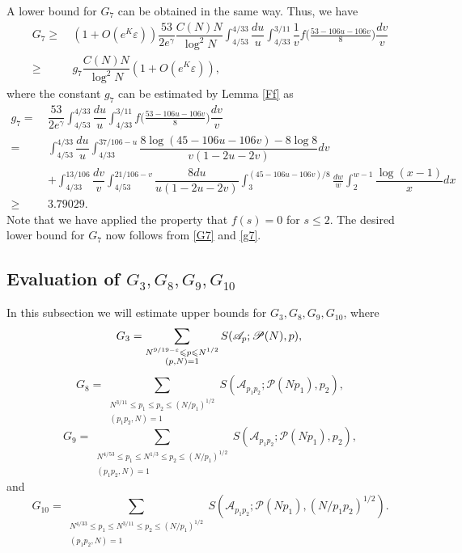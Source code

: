 \documentclass[12pt, a4paper]{amsart}
\def\leq{\leqslant}
\def\le{\leqslant}
\def\ge{\geqslant}
\theoremstyle{plain}
\theoremstyle{remark}
\numberwithin{equation}{section}
\begin{document}
A lower bound for $G_7$ can be obtained in the same way. 
Thus, we have 
\begin{equation}\label{G7}
\begin{aligned}
G_7\ge&\ (1+O(e^K\varepsilon))\dfrac{53}{2e^{\gamma}}\dfrac{C(N)N}{\log ^2N}\int_{4/53}^{4/33}\dfrac{du}{u}\int_{4/33}^{3/11} \dfrac{1}{v}f\bigg(\frac{53-106u-106v}{8}\bigg)\dfrac{dv}{v}\\
\ge &\ g_7\dfrac{C(N)N}{\log^2 N} (1+O(e^K\varepsilon)),
\end{aligned}
\end{equation}
where the constant $g_7$ can be estimated by Lemma \ref{Ff} as 
\begin{equation}\label{g7}
	\begin{aligned}
	g_{7}=\ & \dfrac{53}{2e^{\gamma}}\int_{4/53}^{4/33}\dfrac{du}{u}\int_{4/33}^{3/11}f\bigg(\frac{53-106u-106v}{8}\bigg)\dfrac{dv}{v}\\
	=\ &\int_{4/53}^{4/33}\dfrac{du}{u}\int_{4/33}^{37/106-u} \dfrac{8\log (45-106u-106v)-8\log 8}{v(1-2u-2v)}dv\\
	&+\int_{4/33}^{13/106}\dfrac{dv}{v}\int_{4/53}^{21/106-v} \dfrac{8du}{u(1-2u-2v)}\int_3^{(45-106u-106v)/8} \frac{dw}{w} \int_{2}^{w-1}\dfrac{\log (x-1)}{x}dx\\
\ge\ & 3.79029. 
\end{aligned}
\end{equation}
Note that we have applied the property that $f(s)=0$ for $s\le 2$.  
The desired lower bound for $G_7$ now follows from \eqref{G7} and \eqref{g7}.  

\subsection{Evaluation of $G_3,G_8,G_9,G_{10}$}
In this subsection we will estimate upper bounds for $G_3, G_8, G_9, G_{10}$, where
\[
G_3 =\sum\limits_{\substack{N^{9/19-\varepsilon}\le p\le N^{1/2} \\(p, N)=1}}S(\mathscr{A}_p ; \mathscr{P}(N), p),\\
\]
\[
G_8 = \sum_{\substack{N^{3/11} \leq p_1 \le p_2 \le (N/p_1)^{1/2} \\ (p_1 p_2, N) = 1}} S(\mathscr{A}_{p_1 p_2}; \mathscr{P}(N p_1), p_2),
\] 
\[
G_9 = \sum_{\substack{N^{4/53} \leq p_1 \le N^{1/3} \leq p_2 \le (N/p_1)^{1/2} \\ (p_1 p_2, N) = 1}} S(\mathscr{A}_{p_1 p_2}; \mathscr{P}(N p_1), p_2),
\]
and 
\[
G_{10} = \sum_{\substack{N^{4/33} \leq p_1 \le N^{3/11} \leq p_2 \le (N/p_1)^{1/2} \\ (p_1 p_2, N) = 1}} S(\mathscr{A}_{p_1 p_2}; \mathscr{P}(N p_1), (N/p_1 p_2)^{1/2}). 
\]
	
\end{document}
